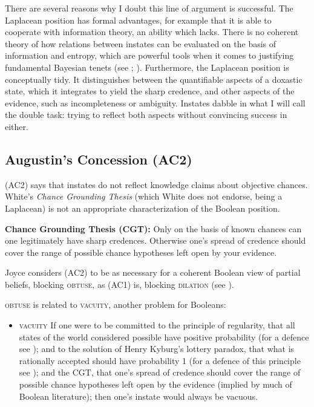 \documentclass[phd,12pt,oneside]{ubcthesis}
\begin{document}
There are several reasons why I doubt this line of argument is
successful. The Laplacean position has formal advantages, for example
that it is able to cooperate with information theory, an ability which
{\augustin} lacks. There is no coherent theory of how relations
between instates can be evaluated on the basis of information and
entropy, which are powerful tools when it comes to justifying
fundamental Bayesian tenets (see ;
). Furthermore, the Laplacean position is
conceptually tidy. It distinguishes between the quantifiable aspects
of a doxastic state, which it integrates to yield the sharp credence,
and other aspects of the evidence, such as incompleteness or
ambiguity. Instates dabble in what I will call the double task: trying
to reflect both aspects without convincing success in either.

\subsection{Augustin's Concession (AC2)}
\label{subsec:chaeniik}

(AC2) says that instates do not reflect knowledge claims about
objective chances. White's \emph{Chance Grounding Thesis} (which White
does not endorse, being a Laplacean) is not an appropriate
characterization of the Boolean position.

\begin{quotex}
  \textbf{Chance Grounding Thesis (CGT):} Only on the basis of known
  chances can one legitimately have sharp credences. Otherwise one's
  spread of credence should cover the range of possible chance
  hypotheses left open by your evidence.
\end{quotex}

{\noindent}Joyce considers (AC2) to be as necessary for a coherent Boolean view
of partial beliefs, blocking \textsc{obtuse}, as (AC1) is, blocking
\textsc{dilation} (see ). 

\textsc{obtuse} is related to \textsc{vacuity}, another problem for
Booleans:

\begin{itemize}
\item \textsc{vacuity} If one were to be committed to the principle of
  regularity, that all states of the world considered possible have
  positive probability (for a defence see
  ); and to the solution of Henry
  Kyburg's lottery paradox, that what is rationally accepted should
  have probability 1 (for a defence of this principle see
  ); and the CGT, that one's spread of
  credence should cover the range of possible chance hypotheses left
  open by the evidence (implied by much of Boolean literature); then
  one's instate would always be vacuous.
\end{itemize}
\end{document}
